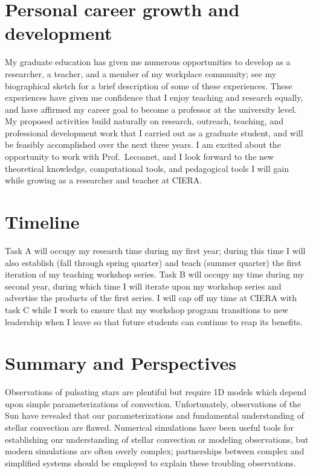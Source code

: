 \documentclass[11pt, preprint]{aastex}
\begin{document}
\section{Personal career growth and development}
\vspace{-8pt}
\label{sct:personal_growth}
My graduate education has given me numerous opportunities to develop as a researcher, a teacher, and a member of my workplace community; see my biographical sketch for a brief description of some of these experiences.
These experiences have given me confidence that I enjoy teaching and research equally, and have affirmed my career goal to become a professor at the university level.
My proposed activities build naturally on research, outreach, teaching, and professional development work that I carried out as a graduate student, and will be feasibly accomplished over the next three years.
I am excited about the opportunity to work with Prof.~Lecoanet, and I look forward to the new theoretical knowledge, computational tools, and pedagogical tools I will gain while growing as a researcher and teacher at CIERA.

\vspace{-22pt}
\section{Timeline}
\vspace{-8pt}
Task A will occupy my research time during my first year; during this time I will also establish (fall through spring quarter) and teach (summer quarter) the first iteration of my teaching workshop series.
Task B will occupy my time during my second year, during which time I will iterate upon my workshop series and advertise the products of the first series. 
I will cap off my time at CIERA with task C while I work to ensure that my workshop program transitions to new leadership when I leave so that future students can continue to reap its benefits.

\vspace{-22pt}
\section{Summary and Perspectives}
\vspace{-8pt}
Observations of pulsating stars are plentiful but require 1D models which depend upon simple parameterizations of convection.
Unfortunately, observations of the Sun have revealed that our parameterizations and fundamental understanding of stellar convection are flawed.
Numerical simulations have been useful tools for establishing our understanding of stellar convection or modeling observations, but modern simulations are often overly complex; partnerships between complex and simplified systems should be employed to explain these troubling observations.
\end{document}
